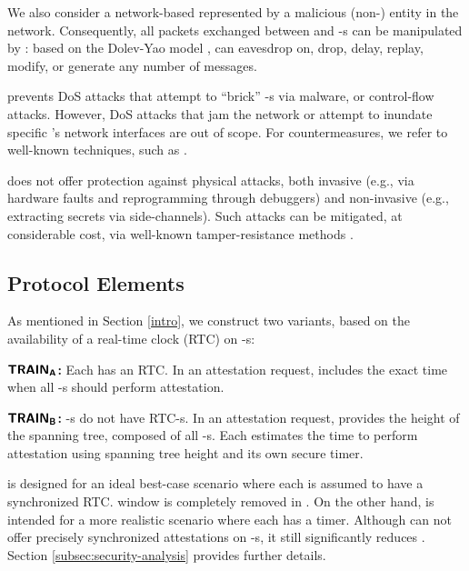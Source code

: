 We also consider a network-based \sadv represented by a malicious (non-\system) entity in the
\prv network. Consequently, all packets exchanged between \vrf and \prv-s can 
be manipulated by \sadv: based on the Dolev-Yao model \cite{dolevYao}, \sadv can eavesdrop on, 
drop, delay, replay, modify, or generate any number of messages. 

\system prevents DoS attacks that attempt to ``brick'' \prv-s via malware,
or control-flow attacks. However, DoS attacks that jam the network or attempt to inundate 
specific \prv's network interfaces are out of scope. 
For countermeasures, we refer to well-known techniques, 
such as \cite{muraleedharan2006jamming,zhijun2020low, mamdouh2018securing}.

\system does not offer protection against physical attacks, both 
invasive (e.g., via hardware faults and reprogramming through debuggers) and non-invasive (e.g., 
extracting secrets via side-channels). Such attacks can be mitigated, at considerable cost, via
well-known tamper-resistance methods \cite{obermaier2018past,ravi2004tamper}.

\subsection{Protocol Elements \label{elems}}
%
As mentioned in Section \ref{intro}, we construct two \system variants, 
based on the availability of a real-time clock (RTC) on \prv-s:
%
\begin{compactenum}[(1)]
    \item \textbf{$\boldsymbol{{\sf{TRAIN_{A}}}}$:} Each \prv has an RTC. In an attestation request, \vrf includes 
    the exact time when all \prv-s should perform attestation. 
    \item \textbf{$\boldsymbol{{\sf{TRAIN_{B}}}}$:} \prv-s do not have RTC-s. In an attestation request, 
    \vrf provides the height of the spanning tree, composed of all \prv-s. Each \prv 
    estimates the time to perform attestation using spanning tree height and its own secure timer.
\end{compactenum}

\noindent \trapsrtc is designed for an ideal best-case scenario where each \prv is assumed to 
have a synchronized RTC. \toctousa window is completely removed in \trapsrtc.
On the other hand, \trapsnortc is intended for a more realistic scenario where each \prv has a timer.
Although \trapsnortc can not offer precisely synchronized attestations on \prv-s, it still significantly reduces \toctousa. Section \ref{subsec:security-analysis} provides further details.

